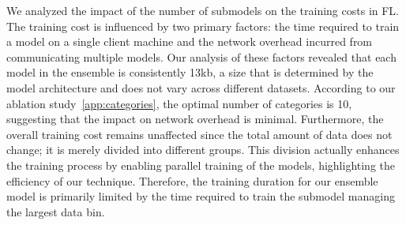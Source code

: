 We analyzed the impact of the number of submodels on the training costs in FL. The training cost is influenced by two primary factors: the time required to train a \gnnshort model on a single client machine and the network overhead incurred from communicating multiple models. Our analysis of these factors revealed that each \gnnshort model in the ensemble is consistently 13kb, a size that is determined by the model architecture and does not vary across different datasets. According to our ablation study~\ref{app:categories}, the optimal number of categories is 10, suggesting that the impact on network overhead is minimal. Furthermore, the overall training cost remains unaffected since the total amount of data does not change; it is merely divided into different groups. This division actually enhances the training process by enabling parallel training of the models, highlighting the efficiency of our technique. Therefore, the training duration for our ensemble model is primarily limited by the time required to train the submodel managing the largest data bin.




